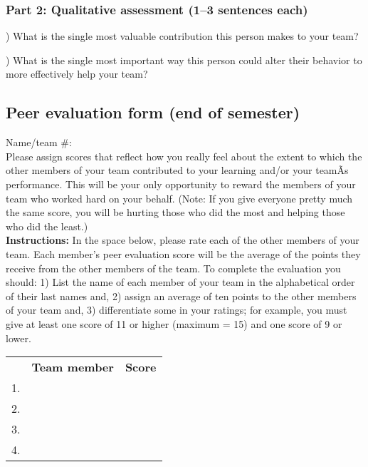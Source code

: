 \documentclass[11pt]{article}
\begin{document}
\subsubsection*{Part 2: Qualitative assessment (1--3 sentences each)}

) What is the single most valuable contribution this person makes to your team?\\

\vspace{1.2cm}

) What is the single most important way this person could alter their behavior to more effectively help your team? 


\newpage
\subsection*{Peer evaluation form (end of semester)}
\pagestyle{empty}

Name/team \#: \\

\noindent Please assign scores that reflect how you really feel about the extent to which the other members of your team contributed to your learning and/or your teamÃs performance. This will be your only opportunity to reward the members of your team who worked hard on your behalf. (Note: If you give everyone pretty much the same score, you will be hurting those who did the most and helping those who did the least.)\\

\noindent \textbf{Instructions:} In the space below, please rate each of the other members of your team. Each member's peer evaluation score will be the average of the points they receive from the other members of the team. To complete the evaluation you should: 1) List the name of each member of your team in the alphabetical order of their last names and, 2) assign an average of ten points to the other members of your team and, 3) differentiate some in your ratings; for example, you must give at least one score of 11 or higher (maximum = 15) and one score of 9 or lower.\\

\begin{center}
\begin{large}
\begin{onehalfspacing}
\begin{tabular}{| p{.5cm} p{5.5cm} p{2.5cm} |}
\hline
&\textbf{Team member} & \textbf{Score} \\

1. & &  \\

2. &  &  \\

3. &  &  \\

4. &  &\\
\hline
\end{tabular}
\end{onehalfspacing}
\end{large}
\end{center}
\end{document}
